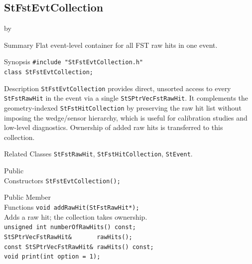 \documentclass[twoside]{article}
\newcommand{\entrylabel}[1]{\mbox{\textbf{{#1}}}\hfil}%
\newenvironment{entry}
{\begin{list}{}%
    {\renewcommand{\makelabel}{\entrylabel}%
     \setlength{\labelwidth}{90pt}%
     \setlength{\leftmargin}{\labelwidth}
     \advance\leftmargin by \labelsep%
      }%
    }%
  {\end{list}}
\newcommand{\Entrylabel}[1]%
{\raisebox{0pt}[1ex][0pt]{\makebox[\labelwidth][l]%
    {\parbox[t]{\labelwidth}{\hspace{0pt}\textbf{{#1}}}}}}
\newenvironment{Entry}%
{\renewcommand{\entrylabel}{\Entrylabel}\begin{entry}}%
  {\end{entry}}
\begin{document}

\subsection{StFstEvtCollection}
\label{sec:StFstEvtCollection}
\begin{Entry}
\item[Summary] Flat event-level container for all FST raw hits in one event.
\item[Synopsis]
    \verb+#include "StFstEvtCollection.h"+\\
    \verb+class StFstEvtCollection;+\\
\item[Description]
  \texttt{StFstEvtCollection} provides direct, unsorted access to every
  \texttt{StFstRawHit} in the event via a single \texttt{StSPtrVecFstRawHit}.  It
  complements the geometry-indexed \texttt{StFstHitCollection} by preserving the raw hit
  list without imposing the wedge/sensor hierarchy, which is useful for calibration
  studies and low-level diagnostics.  Ownership of added raw hits is transferred to this
  collection.
\item[Related Classes]
  \texttt{StFstRawHit}, \texttt{StFstHitCollection}, \texttt{StEvent}.
\item[Public\\ Constructors]
    \verb+StFstEvtCollection();+\\
\item[Public Member\\ Functions]
    \verb+void addRawHit(StFstRawHit*);+\\
    Adds a raw hit; the collection takes ownership.\\[2pt]
    \verb+unsigned int numberOfRawHits() const;+\\
    \verb+StSPtrVecFstRawHit&       rawHits();+\\
    \verb+const StSPtrVecFstRawHit& rawHits() const;+\\
    \verb+void print(int option = 1);+\\
\end{Entry}
\clearpage
\end{document}
